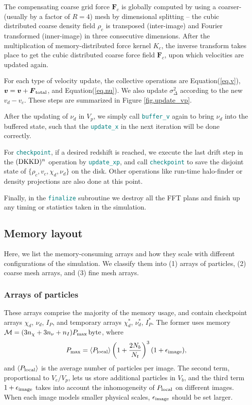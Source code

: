 \documentclass[10pt,twocolumn,preprint]{emulateapj}
\newcommand{\bs}{\boldsymbol}
\newcommand{\tcx}{\textcolor{teal}}
\begin{document}
The compensating coarse grid force ${\bs F}_c$ is globally computed by using a coarser- (usually by a factor of $R=4$) mesh by dimensional splitting -- the cubic distributed coarse density field $\rho_c$ is transposed (inter-image) and Fourier transformed (inner-image) in three consecutive dimensions. After the multiplication of memory-distributed force kernel $K_c$, the inverse transform takes place to get the cubic distributed coarse force field ${\bs F}_c$, upon which velocities are updated again.

For each type of velocity update, the collective operations are Equation(\ref{eq.v}), ${\bs v}={\bs v}+{\bs F}_{\rm total}$, and Equation(\ref{eq.nu}). We also update $\sigma^2_{\Delta}$ according to the new $v_d-v_c$. These steps are summarized in Figure \ref{fig.update_vp}.

After the updating of $\nu_d$ in $V_p$, we simply call {\tt \tcx{buffer\_v}} again to bring $\nu_d$ into the buffered state, such that the {\tt \tcx{update\_x}} in the next iteration will be done correctly.

For {\tt \tcx{checkpoint}},
if a desired redshift is reached, we execute the last drift step in the $({\rm DKKD})^n$ operation by {\tt \tcx{update\_xp}}, and call {\tt \tcx{checkpoint}} to save the disjoint state of $\{\rho_c,v_c,\chi_d,\nu_d\}$ on the disk. Other operations like run-time halo-finder or density projections are also done at this point.

Finally, in the {\tt \tcx{finalize}} subroutine
we destroy all the FFT plans and finish up any timing or statistics taken in the simulation.

\subsection{Memory layout}\label{ss.memory}
Here, we list the memory-consuming arrays and how they scale with different configurations of the simulation. We classify them into (1) arrays of particles, (2) coarse mesh arrays, and (3) fine mesh arrays.

\subsubsection{Arrays of particles}
These arrays comprise the majority of the memory usage, and contain checkpoint arrays $\chi_d$, $\nu_d$, $I_P$, and temporary arrays $\chi_d^*$, $\nu_d^*$, $I_P^*$. The former uses memory $\mathcal{M}=(3n_\chi+3n_\nu+n_I)P_{\rm max}\,{\rm byte}$, where
\begin{equation}\label{eq.npmax}
	P_{\rm max}=\left\langle P_{\rm local} \right\rangle \left( 1+\frac{2N_b}{N_t} \right)^3(1+\epsilon_{\rm image}),
\end{equation}
and $\left\langle P_{\rm local} \right\rangle$ is the average number of particles per image. The second term, proportional to $V_e/V_p$,  lets us store additional particles in $V_b$, and the third term $1+\epsilon_{\rm image}$ takes into account the inhomogeneity of $P_{\rm local}$ on different images. When each image models smaller physical scales, $\epsilon_{\rm image}$ should be set larger.
\end{document}
